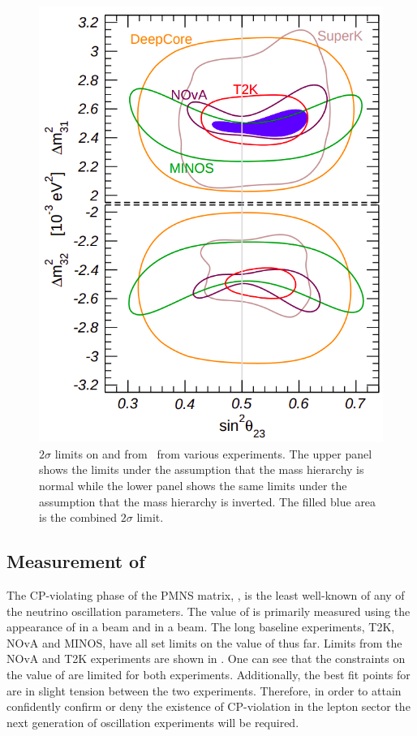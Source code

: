 \begin{figure}[h]
  \centering
  \includegraphics[width=.5\linewidth]{files/figures/theory/theta23Deltam}
  \caption[Experimental limits on  and .]{$2\sigma$ limits on  and  from~\cite{nufit4} from various experiments. The upper panel shows the limits under the assumption that the mass hierarchy is normal while the lower panel shows the same limits under the assumption that the mass hierarchy is inverted. The filled blue area is the combined $2\sigma$ limit.}
  \label{fig:theta23deltam}
\end{figure}

\subsection{Measurement of \dcp}
\label{sec:theory:currentState:dcp}

The CP-violating phase of the PMNS matrix, \dcp, is the least well-known of any of the neutrino oscillation parameters.
The value of \dcp is primarily measured using the appearance of \nue in a \numu beam and \anue in a \anumu beam.
The long baseline experiments, T2K, NOvA and MINOS, have all set limits on the value of \dcp thus far.
Limits from the NOvA and T2K experiments are shown in .
One can see that the constraints on the value of \dcp are limited for both experiments.
Additionally, the best fit points for \dcp are in slight tension between the two experiments.
Therefore, in order to attain confidently confirm or deny the existence of CP-violation in the lepton sector the next generation of oscillation experiments will be required.

